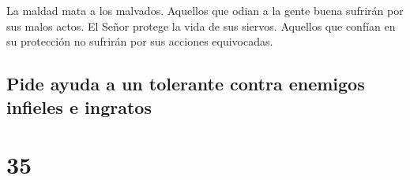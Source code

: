  La maldad mata a los malvados. Aquellos que odian a la
gente buena sufrirán por sus malos actos.  El Señor protege
la vida de sus siervos. Aquellos que confían en su protección no
sufrirán por sus acciones equivocadas.

\hypertarget{pide-ayuda-a-un-tolerante-contra-enemigos-infieles-e-ingratos}{%
\subsection{Pide ayuda a un tolerante contra enemigos infieles e
ingratos}\label{pide-ayuda-a-un-tolerante-contra-enemigos-infieles-e-ingratos}}

\hypertarget{section-34}{%
\section{35}\label{section-34}}

